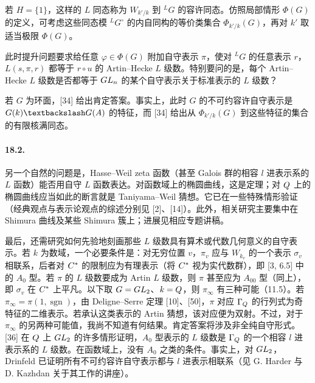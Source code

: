 若 $H=\{1\}$，这样的 $L$ 同态称为 $W_{k'/k}$ 到 ${}^LG$ 的容许同态。仿照局部情形 $\Phi(G)$ 的定义，可考虑这些同态模 ${}^LG^\circ$ 的内自同构的等价类集合 $\Phi_{k'/k}(G)$，再对 $k'$ 取适当极限 $\Phi(G)$。

此时提升问题要求给任意 $\varphi\in\Phi(G)$ 附加自守表示 $\pi$，使对 ${}^LG$ 的任意表示 $r$，$L(s,\pi,r)$ 都等于 $r\circ u$ 的 Artin--Hecke $L$ 级数。特别要问的是，每个 Artin--Hecke $L$ 级数是否都等于 $GL_n$ 的某个自守表示关于标准表示的 $L$ 级数？

若 $G$ 为环面，[34] 给出肯定答案。事实上，此时 $G$ 的不可约容许自守表示是 $G(k)\backslash G(\A)$ 的特征，而 [34] 给出从 $\Phi_{k'/k}(G)$ 到这些特征的集合的有限核满同态。

\paragraph*{18.2.} 另一个自然的问题是，Hasse--Weil zeta 函数（甚至 Galois 群的相容 $l$ 进表示系的 $L$ 函数）能否用自守 $L$ 函数表达。对函数域上的椭圆曲线，这是定理；对 $Q$ 上的椭圆曲线应当如此的断言就是 Taniyama--Weil 猜想。它已在一些特殊情形验证（经典观点与表示论观点的综述分别见 [2]、[14]）。此外，相关研究主要集中在 Shimura 曲线及某些 Shimura 簇上；进展见相应专题讲稿。

最后，还需研究如何先验地刻画那些 $L$ 级数具有算术或代数几何意义的自守表示。若 $k$ 为数域，一个必要条件是：对无穷位置 $v$，$\pi_v$ 应与 $W_{k_v}$ 的一个表示 $\sigma_v$ 相联系，后者对 $C^*$ 的限制应为有理表示（将 $C^*$ 视为实代数群），即 [3, 6.5] 中的 $A_0$ 型。若 $\pi$ 的 $L$ 级数要成为 Artin $L$ 级数，则 $\pi$ 甚至应为 $A_{00}$ 型（同上），即 $\sigma_v$ 在 $C^*$ 上平凡。以下取 $G=GL_2$、$k=Q$，则 $\pi_\infty$ 有三种可能（11.5）。若 $\pi_\infty=\pi(1,\operatorname{sgn})$，由 Deligne--Serre 定理 [10]、[50]，$\pi$ 对应 $\Gamma_{Q}$ 的行列式为奇特征的二维表示。若承认这类表示的 Artin 猜想，该对应便为双射。不过，对于 $\pi_\infty$ 的另两种可能值，我尚不知道有何结果。肯定答案将涉及非全纯自守形式。[36] 在 $Q$ 上 $GL_2$ 的许多情形证明，$A_0$ 型表示的 $L$ 级数是 $\Gamma_{Q}$ 的一个相容 $l$ 进表示系的 $L$ 级数。在函数域上，没有 $A_0$ 之类的条件。事实上，对 $GL_2$，Drinfeld 已证明所有不可约容许自守表示都与 $l$ 进表示相联系（见 G. Harder 与 D. Kazhdan 关于其工作的讲座）。

